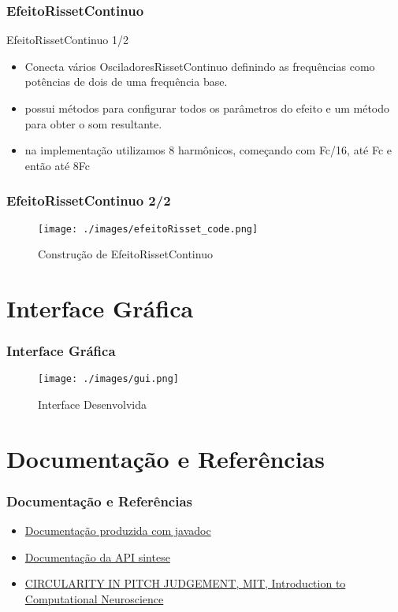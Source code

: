 \documentclass{beamer}
\begin{document}
\subsubsection{EfeitoRissetContinuo}
\begin{frame}{EfeitoRissetContinuo 1/2}
\begin{itemize}
	\item Conecta vários OsciladoresRissetContinuo definindo as frequências
	como potências de dois de uma frequência base.
	\item possui métodos para configurar todos os parâmetros do efeito
	e um método para obter o som resultante.
	\item na implementação utilizamos 8 harmônicos, começando com Fc/16,
	até Fc e então até 8Fc
\end{itemize}
\end{frame}

\begin{frame}
 \frametitle{EfeitoRissetContinuo 2/2}
 \begin{figure}
  \texttt{[image: ./images/efeitoRisset\_code.png]}
  \caption{Construção de EfeitoRissetContinuo}
   \end{figure}
\end{frame}


\section{Interface Gráfica}
\begin{frame}
 \frametitle{Interface Gráfica}
 \begin{figure}
  \texttt{[image: ./images/gui.png]}
  \caption{Interface Desenvolvida}
   \end{figure}
\end{frame}
\section{Documentação e Referências}
\begin{frame}
  \frametitle{Documentação e Referências}
  \begin{itemize}
  \item \href{../doc/index.html}{Documentação produzida com javadoc}
  \item \href{http://www.cic.unb.br/docentes/lcmm/sintese/javadoc/}{Documentação da API sintese}
  \item \href{http://hebb.mit.edu/courses/9.29/2003/athena/auditory/risset.html}{CIRCULARITY IN PITCH JUDGEMENT, MIT, Introduction to Computational Neuroscience}
  \end{itemize}
\end{frame}
\end{document}
